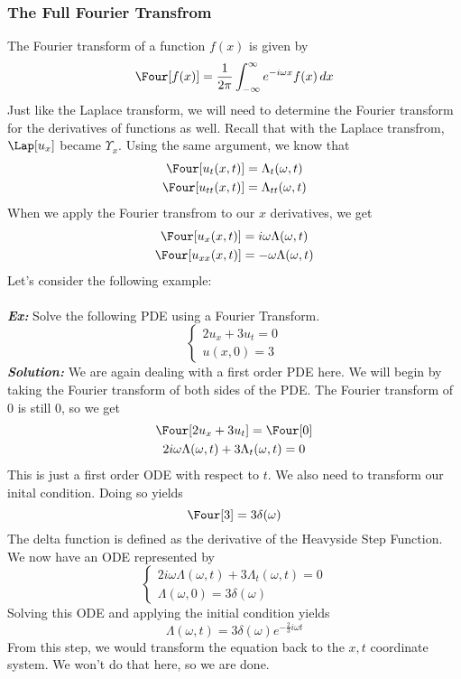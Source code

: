 \subsubsection{The Full Fourier Transfrom}
The Fourier transform of a function $f(x)$ is given by
\[
\Four[f(x)] = \frac{1}{2\pi}\int_{-\infty}^{\infty}e^{-i\omega x}f(x)\mathop{dx}
\]
Just like the Laplace transform, we will need to determine the Fourier transform for the derivatives
of functions as well. Recall that with the Laplace transfrom, $\Lap[u_{x}]$ became $\Upsilon_{x}$.
Using the same argument, we know that
\begin{gather*}
\Four[u_{t}(x,t)] = \Lambda_{t}(\omega,t)\\
\Four[u_{tt}(x,t)] = \Lambda_{tt}(\omega,t)
\end{gather*}
When we apply the Fourier transfrom to our $x$ derivatives, we get
\begin{gather*}
\Four[u_{x}(x,t)] = i\omega\Lambda(\omega,t)\\
\Four[u_{xx}(x,t)] = -\omega\Lambda(\omega,t)
\end{gather*}
Let's consider the following example:\\\\
\noindent \textbf{\textit{Ex:}} Solve the following PDE using a Fourier Transform.
\[
\begin{cases*}
2u_{x} + 3u_{t} = 0\\
u(x,0) = 3
\end{cases*}
\]
\indent \textbf{\textit{Solution:}} We are again dealing with a first order PDE here. We will
begin by taking the Fourier transform of both sides of the PDE. The Fourier transform of 0 is
still 0, so we get
\begin{gather*}
\Four[2u_{x} + 3u_{t}] = \Four[0]\\
2i\omega\Lambda(\omega,t) + 3\Lambda_{t}(\omega,t) = 0
\end{gather*}
This is just a first order ODE with respect to $t$. We also need to transform our inital condition.
Doing so yields
\[
\Four[3] = 3\delta(\omega)
\]
The delta function is defined as the derivative of the Heavyside Step Function. We now have an
ODE represented by
\[
\begin{cases*}
2i\omega\Lambda(\omega,t) + 3\Lambda_{t}(\omega,t) = 0\\
\Lambda(\omega,0) = 3\delta(\omega)
\end{cases*}
\]
Solving this ODE and applying the initial condition yields
\[
\Lambda(\omega,t) = 3\delta(\omega)e^{-\frac{2}{3}i\omega t}
\]
From this step, we would transform the equation back to the $x,t$ coordinate system. We won't do that
here, so we are done.
\newpage

